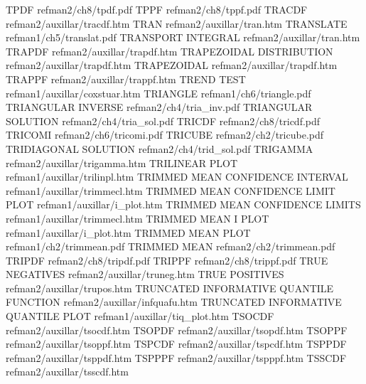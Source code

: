 TPDF                                    refman2/ch8/tpdf.pdf
TPPF                                    refman2/ch8/tppf.pdf
TRACDF                                  refman2/auxillar/tracdf.htm
TRAN                                    refman2/auxillar/tran.htm
TRANSLATE                               refman1/ch5/translat.pdf
TRANSPORT INTEGRAL                      refman2/auxillar/tran.htm
TRAPDF                                  refman2/auxillar/trapdf.htm
TRAPEZOIDAL DISTRIBUTION                refman2/auxillar/trapdf.htm
TRAPEZOIDAL                             refman2/auxillar/trapdf.htm
TRAPPF                                  refman2/auxillar/trappf.htm
TREND TEST                              refman1/auxillar/coxstuar.htm
TRIANGLE                                refman1/ch6/triangle.pdf
TRIANGULAR INVERSE                      refman2/ch4/tria_inv.pdf
TRIANGULAR SOLUTION                     refman2/ch4/tria_sol.pdf
TRICDF                                  refman2/ch8/tricdf.pdf
TRICOMI                                 refman2/ch6/tricomi.pdf
TRICUBE                                 refman2/ch2/tricube.pdf
TRIDIAGONAL SOLUTION                    refman2/ch4/trid_sol.pdf
TRIGAMMA                                refman2/auxillar/trigamma.htm
TRILINEAR PLOT                          refman1/auxillar/trilinpl.htm
TRIMMED MEAN CONFIDENCE INTERVAL        refman1/auxillar/trimmecl.htm
TRIMMED MEAN CONFIDENCE LIMIT PLOT      refman1/auxillar/i_plot.htm
TRIMMED MEAN CONFIDENCE LIMITS          refman1/auxillar/trimmecl.htm
TRIMMED MEAN I PLOT                     refman1/auxillar/i_plot.htm
TRIMMED MEAN PLOT                       refman1/ch2/trimmean.pdf
TRIMMED MEAN                            refman2/ch2/trimmean.pdf
TRIPDF                                  refman2/ch8/tripdf.pdf
TRIPPF                                  refman2/ch8/trippf.pdf
TRUE NEGATIVES                          refman2/auxillar/truneg.htm
TRUE POSITIVES                          refman2/auxillar/trupos.htm
TRUNCATED INFORMATIVE QUANTILE FUNCTION refman2/auxillar/infquafu.htm
TRUNCATED INFORMATIVE QUANTILE PLOT     refman1/auxillar/tiq_plot.htm
TSOCDF                                  refman2/auxillar/tsocdf.htm
TSOPDF                                  refman2/auxillar/tsopdf.htm
TSOPPF                                  refman2/auxillar/tsoppf.htm
TSPCDF                                  refman2/auxillar/tspcdf.htm
TSPPDF                                  refman2/auxillar/tsppdf.htm
TSPPPF                                  refman2/auxillar/tspppf.htm
TSSCDF                                  refman2/auxillar/tsscdf.htm
